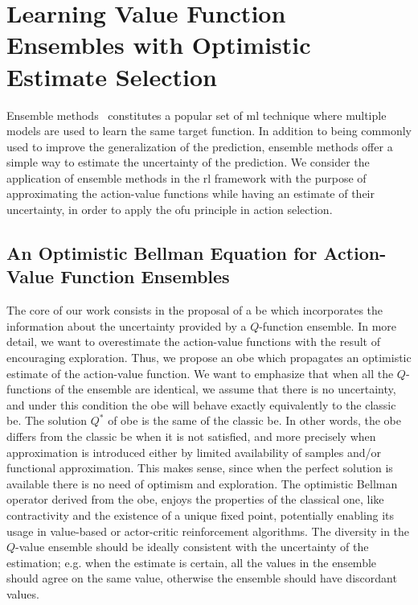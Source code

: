 \section{Learning Value Function Ensembles with Optimistic Estimate Selection}
\label{sec:obe}
Ensemble methods~\cite{opitz1999popular} constitutes a popular set of \gls{ml} technique where multiple models are used to learn the same target function. In addition to being commonly used to improve the generalization of the prediction, ensemble methods offer a simple way to estimate the uncertainty of the prediction. We consider the application of ensemble methods in the \gls{rl} framework with the purpose of approximating the action-value functions while having an estimate of their uncertainty, in order to apply the \gls{ofu} principle in action selection.

\subsection{An Optimistic Bellman Equation for Action-Value Function Ensembles}
The core of our work consists in the proposal of a \gls{be} which incorporates the information about the uncertainty provided by a $Q$-function ensemble.
In more detail, we want to overestimate the action-value functions with the result of encouraging exploration.   
Thus, we propose an \gls{obe} which propagates an optimistic estimate of the action-value function. 
We want to emphasize that when all the $Q$-functions of the ensemble are identical, we assume that there is no uncertainty, and under this condition the \gls{obe} will behave exactly equivalently to the classic \gls{be}. The solution $Q^*$ of \gls{obe} is the same of the classic \gls{be}. In other words, the \gls{obe} differs from the classic \gls{be} when it is not satisfied, and more precisely when approximation is introduced either by limited availability of samples and/or functional approximation. This makes sense, since when the perfect solution is available there is no need of optimism and exploration. 
The optimistic Bellman operator derived from the \gls{obe}, enjoys the properties of the classical one, like contractivity and the existence of a unique fixed point, potentially enabling its usage in value-based or actor-critic reinforcement algorithms. 
The diversity in the $Q$-value ensemble should be ideally consistent with the uncertainty of the estimation; e.g. when the estimate is certain, all the values in the ensemble should agree on the same value, otherwise the ensemble should have discordant values.
